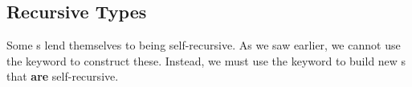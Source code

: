 \subsection{Recursive Types}\label{subsec:Recursive_Types}
Some s lend themselves to being self-recursive.
As we saw earlier, we cannot use the  keyword to construct these.
Instead, we must use the  keyword to build new s that \textbf{are} self-recursive.


